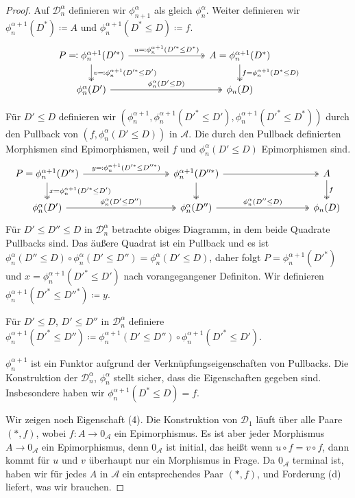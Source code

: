 \documentclass[a4paper, parskip=half]{scrartcl}
\theoremstyle{marginbreak}
\theoremstyle{nonumberplain}
\newtheorem{proof}{Beweis.}
\newcommand\cat\mathcal
\newcommand{\n}{\pgfmatrixnextcell}
\begin{document}
{\begin{proof}
			Auf $\cat{D}_n^\alpha$ definieren wir $\phi_{n+1}^\alpha$ als gleich
			$\phi_n^\alpha$. Weiter definieren wir $\phi_n^{\alpha+1}(D^*)\coloneqq A$
			und $\phi_n^{\alpha+1}(D^*\leq D)\coloneqq f$.
			\[
				\begin{tikzcd}[column sep=8em]
					P \eqqcolon \phi_n^{\alpha+1}(D'^*)
						\ar[two heads]{d}{v\eqqcolon \phi_n^{\alpha + 1}(D'^*\leq D')}
						\ar[two heads]{r}{u\eqqcolon \phi_n^{\alpha+1}(D'^*\leq D^*)}
					\n A=\phi_n^{\alpha+1}(D^*)
						\ar[two heads]{d}{f = \phi_n^{\alpha+1}(D^*\leq D)}\\
					\phi_n^\alpha(D') \ar[two heads]{r}{\phi_n^\alpha(D'\leq D)} \n \phi_n(D)
				\end{tikzcd}
			\]

			Für $D'\leq D$ definieren wir $(\phi_n^{\alpha+1}, \phi_n^{\alpha+1}(D'^*\leq D'),
			\phi_n^{\alpha+1}(D'^*\leq D^*))$ durch den Pullback
			von $(f, \phi_n^\alpha(D'\leq D))$ in $\cat{A}$. Die durch den Pullback
			definierten Morphismen sind Epimorphismen, weil $f$ und $\phi_n^\alpha(D'\leq D)$
			Epimorphismen sind.
			\[
				\begin{tikzcd}[column sep=9em]
					P=\phi_n^{\alpha+1}(D'^*)
						\ar[two heads]{d}{x=\phi_n^{\alpha+1}(D'^*\leq D')}
						\ar[two heads]{r}{y\eqqcolon \phi_n^{\alpha+1}(D'^*\leq D''^*)} \n
					\phi_n^{\alpha+1}(D''^*)
						\ar[two heads]{d}{}
						\ar[two heads]{r}{} \n
					A
						\ar[two heads]{d}{f} \\
					\phi_n^\alpha(D')
						\ar[two heads]{r}{\phi_n^\alpha(D'\leq D'')} \n
					\phi_n^\alpha(D'')
						\ar[two heads]{r}{\phi_n^\alpha(D''\leq D)} \n
					\phi_n(D)
				\end{tikzcd}
			\]
			Für $D'\leq D''\leq D$ in $\cat{D}_n^\alpha$ betrachte obiges Diagramm,
			in dem beide Quadrate Pullbacks sind. Das äußere Quadrat ist ein Pullback
			und es ist $\phi_n^\alpha(D''\leq D)\circ\phi_n^\alpha(D'\leq D'')=\phi_n^\alpha(D'\leq D)$,
			daher folgt $P=\phi_n^{\alpha+1}(D'^*)$
			und $x=\phi_n^{\alpha+1}(D'^*\leq D')$
			nach vorangegangener Definiton. Wir definieren $\phi_n^{\alpha+1}(D'^*\leq D''^*)\coloneqq y$.

			Für $D'\leq D$, $D'\leq D''$ in $\cat{D}_n^\alpha$ definiere
			$\phi_n^{\alpha+1}(D'^*\leq D'')\coloneqq \phi_n^{\alpha+1}(D'\leq D'')
			\circ\phi_n^{\alpha+1}(D'^*\leq D')$.

			$\phi_n^{\alpha+1}$ ist ein Funktor aufgrund der Verknüpfungseigenschaften
			von Pullbacks.
			Die Konstruktion der $\cat{D}_n^\alpha$, $\phi_n^\alpha$ stellt sicher,
			dass die Eigenschaften gegeben sind. Insbesondere haben wir
			$\phi_n^{\alpha+1}(D^*\leq D)=f$.

			Wir zeigen noch Eigenschaft (4). Die Konstruktion von $\cat{D}_1$ läuft
			über alle Paare $(*, f)$, wobei $f\colon A\to 0_\cat{A}$ ein Epimorphismus.
			Es ist aber jeder Morphismus $A\to 0_\cat{A}$ ein Epimorphismus, denn
			$0_\cat{A}$ ist initial, das heißt wenn $u\circ f=v\circ f$, dann kommt für $u$ und $v$
			überhaupt nur ein Morphismus in Frage. Da $0_\cat{A}$ terminal ist,
			haben wir für jedes $A$ in $\cat{A}$ ein entsprechendes Paar $(*, f)$,
			und Forderung (d) liefert, was wir brauchen.
		\end{proof}}
\end{document}
